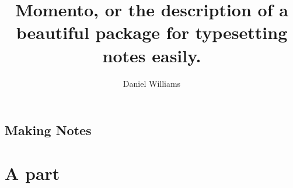 \documentclass[a4paper, openany, oldfontcommands,twocolumn, 10pt]{momento}
\title{Momento, or the description of a beautiful package for typesetting notes easily.}
\author{Daniel Williams}
\begin{document}
\maketitle
\lipsum

\chapter{Making Notes}
\label{cha:making-notes}

\lipsum

\part{A part}
\label{part:part}
\end{document}
